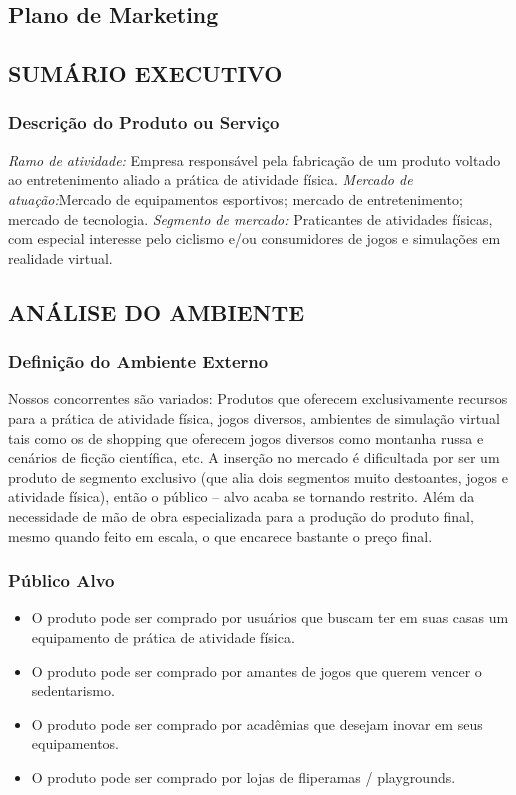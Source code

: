 \begin{apendicesenv}
\section{Plano de Marketing}


\subsection{SUMÁRIO EXECUTIVO}
 
\subsubsection{Descrição do Produto ou Serviço }
 \textit{Ramo de atividade:}
Empresa responsável pela fabricação  de um produto voltado ao entretenimento aliado a prática de atividade física. 
 \textit{Mercado de atuação:}Mercado de equipamentos esportivos; mercado de entretenimento; mercado de tecnologia. 
 \textit{Segmento de mercado:} Praticantes de atividades físicas, com especial interesse pelo ciclismo e/ou consumidores de jogos e simulações em realidade virtual. 

\subsection{ANÁLISE DO AMBIENTE}

\subsubsection{Definição do Ambiente Externo} 

Nossos concorrentes são variados: Produtos que oferecem exclusivamente recursos para a prática de atividade física, jogos diversos, ambientes de simulação virtual tais como os de shopping que oferecem jogos diversos como montanha russa e cenários de ficção científica, etc. 
A inserção no mercado é dificultada por ser um produto de segmento exclusivo (que alia dois segmentos muito destoantes, jogos e atividade física), então o público – alvo acaba se tornando restrito. Além da necessidade de mão de obra especializada para a produção do produto final, mesmo quando feito em escala, o que encarece bastante o preço final. 

\subsubsection{Público Alvo}

\begin{itemize}
\item 
O produto pode ser comprado por usuários que buscam ter em suas casas um equipamento de prática de atividade física.
\item
O produto pode ser comprado por amantes de jogos que querem vencer o sedentarismo. 
\item
O produto pode ser comprado por acadêmias que desejam inovar em seus equipamentos. 
\item
O produto pode ser comprado por lojas de fliperamas / playgrounds.


\end{itemize}
\end{apendicesenv}

